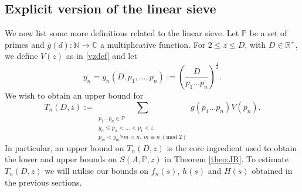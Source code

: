 \documentclass[12pt]{amsart}
\begin{document}
\subsection{Explicit version of the linear sieve}
\label{ELS}
We now list some more definitions related to the linear sieve. Let $\mathbb{P}$ be a set of primes and $g(d):\mathbb{N}\rightarrow \mathbb{C}$ a multiplicative function. For $2\le z \le D$, with $D \in \mathbb{R}^+$, we define $V(z)$ as in \eqref{vzdef} and let
\begin{equation*} \label{eq: def-y_n}
    y_n=y_n( D, p_1, \ldots, p_n):=\left( \frac{D}{p_1 \ldots p_n}\right)^{\frac{1}{2}}.
\end{equation*}
We wish to obtain an upper bound for
\begin{equation} \label{eq: def-T-n-D-z}
T_n(D,z):= \sum_{\substack{p_1 \ldots p_n \in \mathbb{P}\\y_n\le p_n < \ldots<p_1<z\\p_m<y_m\forall m<n,~m\equiv n\: (\text{mod }2)}}g(p_1\ldots p_n)V(p_n).
\end{equation} 
In particular, an upper bound on $T_n(D,z)$ is the core ingredient used to obtain the lower and upper bounds on $S(A,\mathbb{P},z)$ in Theorem \ref{theo:JR}. To estimate $T_n(D,z)$ we will utilise our bounds on $f_n(s)$, $h(s)$ and $H(s)$ obtained in the previous sections.
\end{document}
